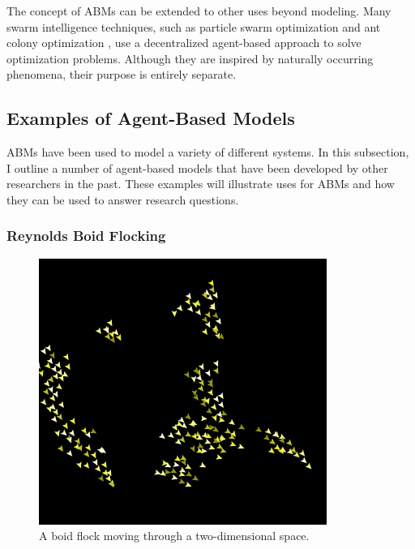 The concept of ABMs can be extended to other uses beyond modeling.
Many swarm intelligence techniques, such as particle swarm optimization \cite{kennedy1995pso} and ant colony optimization \cite{dorigo2004aco}, use a decentralized agent-based approach to solve optimization problems.
Although they are inspired by naturally occurring phenomena, their purpose is entirely separate.




\subsection{Examples of Agent-Based Models}

ABMs have been used to model a variety of different systems.
In this subsection, I outline a number of agent-based models that have been developed by other researchers in the past.
These examples will illustrate uses for ABMs and how they can be used to answer research questions.


\subsubsection{Reynolds Boid Flocking}

\begin{figure}[ht]
\centering
\includegraphics[scale=.66667]{images/netlogo_boidflock.png}
\caption{A boid flock moving through a two-dimensional space.}
\label{fig:netlogoboids}
\end{figure}

